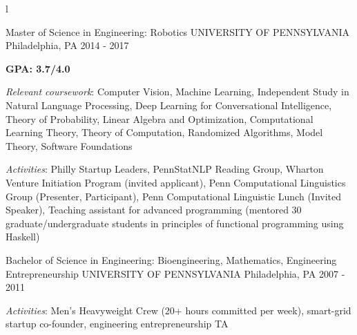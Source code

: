 l
\begin{cventries}
  \cventry
    {Master of Science in Engineering: Robotics}
    {UNIVERSITY OF PENNSYLVANIA}
    {Philadelphia, PA}
    {2014 - 2017}
    {
      \begin{cvitems}
        \item \textbf{GPA: 3.7/4.0}
        \item \textit{Relevant coursework}: Computer Vision, Machine Learning, Independent Study in Natural Language Processing, Deep Learning for Conversational Intelligence, Theory of Probability, Linear Algebra and Optimization, Computational Learning Theory, Theory of Computation, Randomized Algorithms, Model Theory, Software Foundations
        \item \textit{Activities}: Philly Startup Leaders, PennStatNLP Reading Group, Wharton Venture Initiation Program (invited applicant), Penn Computational Linguistics Group (Presenter, Participant),  Penn Computational Linguistic Lunch (Invited Speaker), Teaching assistant for advanced programming (mentored 30 graduate/undergraduate students in principles of functional programming using Haskell)
      \end{cvitems}
    }
  \cventry
    {Bachelor of Science in Engineering: Bioengineering, Mathematics, Engineering Entrepreneurship}
    {UNIVERSITY OF PENNSYLVANIA}
    {Philadelphia, PA}
    {2007 - 2011}
    {
      \begin{cvitems}
        \item \textit{Activities}: Men’s Heavyweight Crew (20+ hours committed per week), smart-grid startup co-founder, engineering entrepreneurship TA
      \end{cvitems}
    }
\end{cventries}

